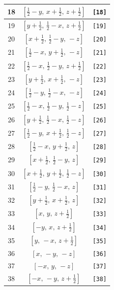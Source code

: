 \documentclass[fleqn,8pt]{jsarticle}
\begin{document}
\begin{longtable}{ccc}
18 & $\left[ \frac{1}{2} - y,\, x + \frac{1}{2},\, z + \frac{1}{2} \right]$ & {\tt [18]} \\ \hline
19 & $\left[ y + \frac{1}{2},\, \frac{1}{2} - x,\, z + \frac{1}{2} \right]$ & {\tt [19]} \\ \hline
20 & $\left[ x + \frac{1}{2},\, \frac{1}{2} - y,\, - z \right]$ & {\tt [20]} \\ \hline
21 & $\left[ \frac{1}{2} - x,\, y + \frac{1}{2},\, - z \right]$ & {\tt [21]} \\ \hline
22 & $\left[ \frac{1}{2} - x,\, \frac{1}{2} - y,\, z + \frac{1}{2} \right]$ & {\tt [22]} \\ \hline
23 & $\left[ y + \frac{1}{2},\, x + \frac{1}{2},\, - z \right]$ & {\tt [23]} \\ \hline
24 & $\left[ \frac{1}{2} - y,\, \frac{1}{2} - x,\, - z \right]$ & {\tt [24]} \\ \hline
25 & $\left[ \frac{1}{2} - x,\, \frac{1}{2} - y,\, \frac{1}{2} - z \right]$ & {\tt [25]} \\ \hline
26 & $\left[ y + \frac{1}{2},\, \frac{1}{2} - x,\, \frac{1}{2} - z \right]$ & {\tt [26]} \\ \hline
27 & $\left[ \frac{1}{2} - y,\, x + \frac{1}{2},\, \frac{1}{2} - z \right]$ & {\tt [27]} \\ \hline
28 & $\left[ \frac{1}{2} - x,\, y + \frac{1}{2},\, z \right]$ & {\tt [28]} \\ \hline
29 & $\left[ x + \frac{1}{2},\, \frac{1}{2} - y,\, z \right]$ & {\tt [29]} \\ \hline
30 & $\left[ x + \frac{1}{2},\, y + \frac{1}{2},\, \frac{1}{2} - z \right]$ & {\tt [30]} \\ \hline
31 & $\left[ \frac{1}{2} - y,\, \frac{1}{2} - x,\, z \right]$ & {\tt [31]} \\ \hline
32 & $\left[ y + \frac{1}{2},\, x + \frac{1}{2},\, z \right]$ & {\tt [32]} \\ \hline
33 & $\left[ x,\, y,\, z + \frac{1}{2} \right]$ & {\tt [33]} \\ \hline
34 & $\left[ - y,\, x,\, z + \frac{1}{2} \right]$ & {\tt [34]} \\ \hline
35 & $\left[ y,\, - x,\, z + \frac{1}{2} \right]$ & {\tt [35]} \\ \hline
36 & $\left[ x,\, - y,\, - z \right]$ & {\tt [36]} \\ \hline
37 & $\left[ - x,\, y,\, - z \right]$ & {\tt [37]} \\ \hline
38 & $\left[ - x,\, - y,\, z + \frac{1}{2} \right]$ & {\tt [38]} \\ \hline

\end{longtable}
\end{document}
